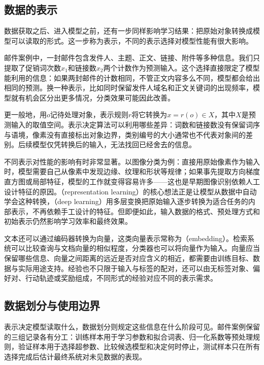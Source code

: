 \subsection{数据的表示}
\label{sec:experience-data-representation}

数据获取之后、进入模型之前，还有一步同样影响学习结果：把原始对象转换成模型可以读取的形式。这一步称为表示，不同的表示选择对模型性能有很大影响。

邮件案例中，一封邮件包含发件人、主题、正文、链接、附件等多种信息。我们只提取了促销词次数$x_1$和链接数$x_2$两个计数作为预测输入。这个选择直接限定了模型能利用的信息：如果两封邮件的计数相同，不管正文内容多么不同，模型都会给出相同的预测。换一种表示，比如同时保留发件人域名和正文关键词的出现频率，模型就有机会区分出更多情况，分类效果可能因此改善。

更一般地，用$o$记待处理对象，表示规则$r$将它转换为$x=r(o)\in X$，其中$X$是预测输入的取值空间。表示决定算法可以利用哪些差异：词数和链接数没有保留词序与语境，像素没有直接标出对象边界，类别编号的大小通常也不代表对象间的差别。后续模型仅凭转换后的输入，无法找回已经舍去的信息。

不同表示对性能的影响有时非常显著。以图像分类为例：直接用原始像素作为输入时，模型需要自己从像素中发现边缘、纹理和形状等规律；如果事先提取方向梯度直方图或局部特征，模型的工作就变得容易许多——这也是早期图像识别依赖人工设计特征的原因。（representation learning）的核心想法正是让模型从数据中自动学会这种转换，（deep learning）用多层变换把原始输入逐步转换为适合任务的内部表示，不再依赖手工设计的特征。但即便如此，输入数据的格式、预处理方式和初始表示仍然影响学习效率和最终效果。

文本还可以通过编码器转换为向量，这类向量表示常称为（embedding）。检索系统可以比较查询与文档向量的相似程度，分类器也可以将向量作为输入。向量应当保留哪些信息、向量之间距离的远近是否对应含义的相近，都需要由训练目标、数据与实际用途支持。经验也不只限于输入与标签的配对，还可以由无标签对象、偏好对、行动轨迹或奖励组成，不同形式的经验对应不同的表示需求。

\subsection{数据划分与使用边界}
\label{sec:experience-data-boundary}

表示决定模型读取什么，数据划分则规定这些信息在什么阶段可见。邮件案例保留的三组记录各有分工：训练样本用于学习参数和拟合词表、归一化系数等预处理规则，验证样本用于选择超参数、比较候选模型和决定何时停止，测试样本只在所有选择完成后估计最终系统对未见数据的表现。

